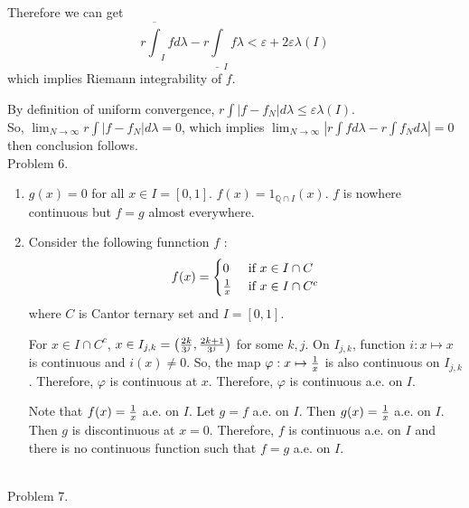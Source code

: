 Therefore we can get
\begin{equation*}
	r \overline{\int}_I fd\lambda - r\underline{\int}_I f\lambda < \varepsilon + 2\varepsilon \lambda\left( I \right)
	\label{3}
\end{equation*}
which implies Riemann integrability of $f$.

By definition of uniform convergence, $r\int \left | f - f_N \right | d\lambda \leq \varepsilon \lambda\left( I \right)$.\\
So, $\lim_{N\rightarrow \infty}r\int \left | f - f_N \right | d\lambda = 0$, which implies $\lim_{N\rightarrow \infty}\left | r\int fd\lambda - r\int f_N d\lambda \right | = 0$ then conclusion follows. \\

Problem 6.\\

\begin{enumerate}[label = (\alph*)]
	\item $g(x) = 0$ for all $x \in I = \left[ 0, 1 \right]$. $f(x) = 1_{\mathbb{Q}\cap I}(x)$. $f$ is nowhere continuous but $f = g$ almost everywhere.
	\item Consider the following funnction $f$ :
		\begin{equation*}
			f(x) = 
			\begin{cases}
				0 & \text{ if } x \in I\cap C \\
				{1 \over x } & \text{ if } x \in I \cap C^{c}
			\end{cases}
			\label{<+label+>}
		\end{equation*}
		where $C$ is Cantor ternary set and $I = \left[ 0, 1 \right]$.
		
		For $x \in I \cap C^c$, $x \in I_{j, k} =  \left( {2k \over 3^j}, {2k+1 \over 3^j} \right)$ for some $k, j$. 
		On $I_{j, k}$, function $i : x \mapsto x$ is continuous and $i(x) \ne 0$. So, the map $\varphi:x \mapsto {1\over x}$ is also continuous on $I_{j, k}$.
		Therefore, $\varphi$ is continuous at $x$. Therefore, $\varphi$ is continuous a.e. on $I$.

		Note that $f(x) = {1\over x }$ a.e. on $I$. Let $g = f$ a.e. on $I$. Then $g(x) = {1\over x}$ a.e. on $I$. Then $g$ is discontinuous at $x = 0$. Therefore, $f$ is continuous a.e. on $I$ and there is no continuous function such that $f = g$ a.e. on $I$.
\end{enumerate}

\hfill \\

Problem 7. \\

